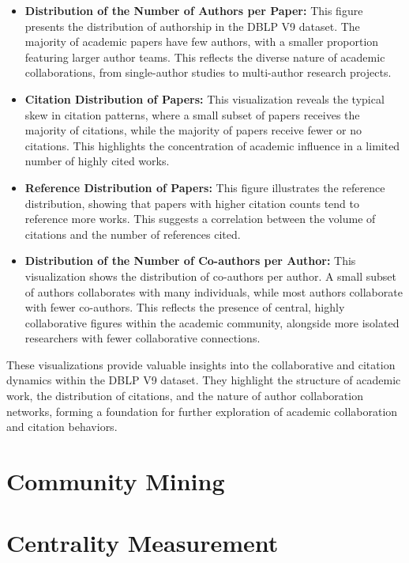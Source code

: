 \documentclass[11pt]{article}
\begin{document}
\begin{itemize}
	\item \textbf{Distribution of the Number of Authors per Paper:} This figure presents the distribution of authorship in the DBLP V9 dataset. The majority of academic papers have few authors, with a smaller proportion featuring larger author teams. This reflects the diverse nature of academic collaborations, from single-author studies to multi-author research projects.
	\item \textbf{Citation Distribution of Papers:} This visualization reveals the typical skew in citation patterns, where a small subset of papers receives the majority of citations, while the majority of papers receive fewer or no citations. This highlights the concentration of academic influence in a limited number of highly cited works.
	\item \textbf{Reference Distribution of Papers:} This figure illustrates the reference distribution, showing that papers with higher citation counts tend to reference more works. This suggests a correlation between the volume of citations and the number of references cited.
	\item \textbf{Distribution of the Number of Co-authors per Author:} This visualization shows the distribution of co-authors per author. A small subset of authors collaborates with many individuals, while most authors collaborate with fewer co-authors. This reflects the presence of central, highly collaborative figures within the academic community, alongside more isolated researchers with fewer collaborative connections.
\end{itemize}

These visualizations provide valuable insights into the collaborative and citation dynamics within the DBLP V9 dataset. They highlight the structure of academic work, the distribution of citations, and the nature of author collaboration networks, forming a foundation for further exploration of academic collaboration and citation behaviors.




\section{Community Mining}

\section{Centrality Measurement}
\end{document}
